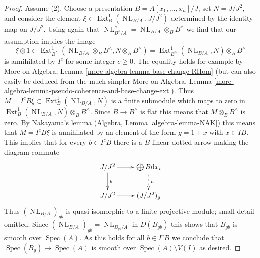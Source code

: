 \documentclass{stacks-project}
\theoremstyle{plain}
\theoremstyle{definition}
\theoremstyle{remark}
\numberwithin{equation}{subsection}
\def\Spec{\mathop{\mathrm{Spec}}}
\def\Ext{\mathop{\mathrm{Ext}}\nolimits}
\def\NL{\mathop{N\!L}\nolimits}
\begin{document}
\begin{proof}
\medskip\noindent
Assume (2). Choose a presentation
$B = A[x_1, \ldots, x_n]/J$, set $N = J/J^2$, and
consider the element $\xi \in \Ext^1_B(\NL_{B/A}, J/J^2)$
determined by the identity map on $J/J^2$.
Using again that $\NL_{B^\wedge/A}^\wedge = \NL_{B/A} \otimes_B B^\wedge$
we find that our assumption implies the image
$$
\xi \otimes 1 \in
\Ext^1_{B^\wedge}(\NL_{B/A} \otimes_B B^\wedge, N \otimes_B B^\wedge) =
\Ext^1_{B^\wedge}(\NL_{B/A}, N) \otimes_B B^\wedge
$$
is annihilated by $I^c$ for some integer $c \geq 0$.
The equality holds for example by
More on Algebra, Lemma \ref{more-algebra-lemma-base-change-RHom}
(but can also easily be deduced from the much simpler
More on Algebra, Lemma
\ref{more-algebra-lemma-pseudo-coherence-and-base-change-ext}).
Thus $M = I^cB\xi \subset \Ext^1_B(\NL_{B/A}, N)$ is a finite submodule
which maps to zero in $\Ext^1_B(\NL_{B/A}, N) \otimes_B B^\wedge$.
Since $B \to B^\wedge$ is flat this means that
$M \otimes_B B^\wedge$ is zero. By 
Nakayama's lemma (Algebra, Lemma \ref{algebra-lemma-NAK})
this means that $M = I^cB\xi$ is annihilated by an element
of the form $g = 1 + x$ with $x \in IB$.
This implies that for every $b \in I^cB$ there is a
$B$-linear dotted arrow making the diagram commute
$$
\xymatrix{
J/J^2 \ar[r] \ar[d]^b & \bigoplus B\text{d}x_i \ar@{..>}[d]^h \\
J/J^2 \ar[r] & (J/J^2)_g
}
$$
Thus $(\NL_{B/A})_{gb}$ is quasi-isomorphic
to a finite projective module; small detail omitted.
Since $(\NL_{B/A})_{gb} = \NL_{B_{gb}/A}$ in $D(B_{gb})$
this shows that $B_{gb}$ is smooth over $\Spec(A)$.
As this holds for all $b \in I^cB$ we conclude
that $\Spec(B_g) \to \Spec(A)$ is smooth over $\Spec(A) \setminus V(I)$
as desired.
\end{proof}
\end{document}
